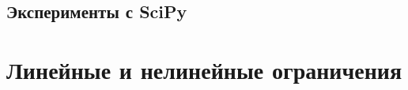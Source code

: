\documentclass[12pt, a4paper, oneside, final]{article}
\begin{document}
	\subsection*{Эксперименты с SciPy}
	\newpage
	\section*{Линейные и нелинейные ограничения}
\end{document}
